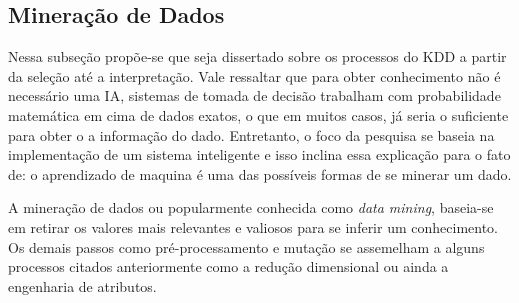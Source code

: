 \subsection{Mineração de Dados}
Nessa subseção propõe-se que seja dissertado sobre os processos do KDD a partir da seleção até a interpretação. Vale ressaltar que para obter conhecimento não é necessário uma IA, sistemas de tomada de decisão trabalham com probabilidade matemática em cima de dados exatos, o que em muitos casos, já seria o suficiente para obter o a informação do dado. Entretanto, o foco da pesquisa se baseia na implementação de um sistema inteligente e isso inclina essa explicação para o fato de: o aprendizado de maquina é uma das possíveis formas de se minerar um dado.

A mineração de dados ou popularmente conhecida como \textit{data mining}, baseia-se em retirar os valores mais relevantes e valiosos para se inferir um conhecimento. Os demais passos como pré-processamento e mutação se assemelham a alguns processos citados anteriormente como a redução dimensional ou ainda a engenharia de atributos.

